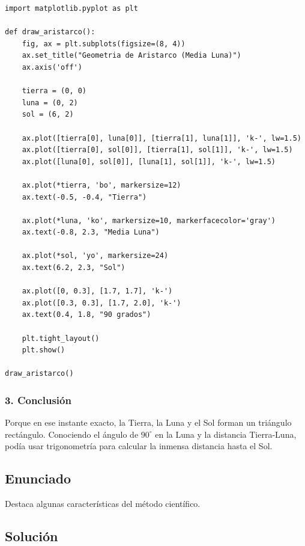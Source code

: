 \documentclass[12pt, a4paper]{article}
\begin{document}
\begin{lstlisting}
import matplotlib.pyplot as plt

def draw_aristarco():
    fig, ax = plt.subplots(figsize=(8, 4))
    ax.set_title("Geometria de Aristarco (Media Luna)")
    ax.axis('off')
    
    tierra = (0, 0)
    luna = (0, 2)
    sol = (6, 2)
    
    ax.plot([tierra[0], luna[0]], [tierra[1], luna[1]], 'k-', lw=1.5)
    ax.plot([tierra[0], sol[0]], [tierra[1], sol[1]], 'k-', lw=1.5)
    ax.plot([luna[0], sol[0]], [luna[1], sol[1]], 'k-', lw=1.5)
    
    ax.plot(*tierra, 'bo', markersize=12)
    ax.text(-0.5, -0.4, "Tierra")
    
    ax.plot(*luna, 'ko', markersize=10, markerfacecolor='gray')
    ax.text(-0.8, 2.3, "Media Luna")
    
    ax.plot(*sol, 'yo', markersize=24)
    ax.text(6.2, 2.3, "Sol")
    
    ax.plot([0, 0.3], [1.7, 1.7], 'k-')
    ax.plot([0.3, 0.3], [1.7, 2.0], 'k-')
    ax.text(0.4, 1.8, "90 grados")
    
    plt.tight_layout()
    plt.show()

draw_aristarco()
\end{lstlisting}

\subsubsection*{3. Conclusión}
Porque en ese instante exacto, la Tierra, la Luna y el Sol forman un triángulo rectángulo. Conociendo el ángulo de $90^\circ$ en la Luna y la distancia Tierra-Luna, podía usar trigonometría para calcular la inmensa distancia hasta el Sol.

\newpage

\subsection*{Enunciado}
Destaca algunas características del método científico.

\subsection*{Solución}
\end{document}

